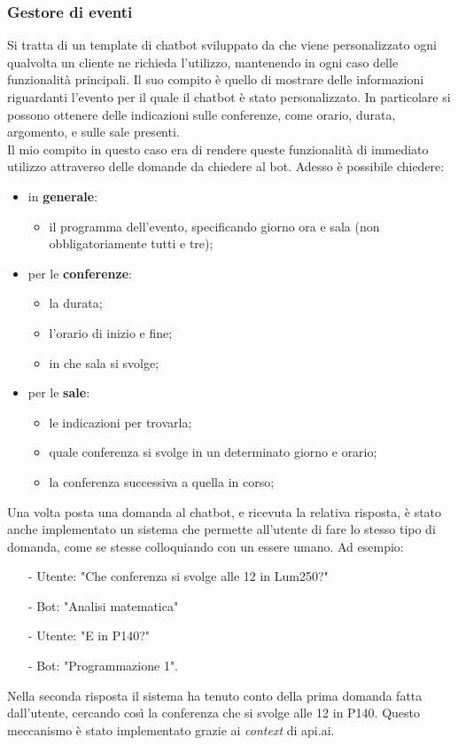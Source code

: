 \subsubsection{Gestore di eventi}
Si tratta di un template di \gls{chatbot} sviluppato da \azienda{} che viene  personalizzato ogni qualvolta un cliente ne richieda l'utilizzo, mantenendo in ogni caso delle funzionalità principali. Il suo compito è quello di mostrare delle informazioni riguardanti l'evento per il quale il \gls{chatbot} è stato personalizzato. In particolare si possono ottenere delle indicazioni sulle conferenze, come orario, durata, argomento, e sulle sale presenti.\\
Il mio compito in questo caso era di rendere queste funzionalità di immediato utilizzo attraverso delle domande da chiedere al bot. Adesso è possibile chiedere:
\begin{itemize}
	\item in \textbf{generale}:
	\begin{itemize}
		\item il programma dell'evento, specificando giorno ora e sala (non obbligatoriamente tutti e tre);
	\end{itemize}
	\item per le \textbf{conferenze}:
	\begin{itemize}
		\item la durata;
		\item l'orario di inizio e fine;
		\item in che sala si svolge;
	\end{itemize}
	\item per le \textbf{sale}:
	\begin{itemize}
		\item le indicazioni per trovarla;
		\item quale conferenza si svolge in un determinato giorno e orario;
		\item la conferenza successiva a quella in corso;
	\end{itemize}
\end{itemize}

Una volta posta una domanda al \gls{chatbot}, e ricevuta la relativa risposta, è stato anche implementato un sistema che permette all'utente di fare lo stesso tipo di domanda, come se stesse colloquiando con un essere umano. Ad esempio:

\begin{itemize}
	\item[-] Utente: "Che conferenza si svolge alle 12 in Lum250?"
	\item[-] Bot: "Analisi matematica"
	\item[-] Utente: "E in P140?"
	\item[-] Bot: "Programmazione 1".
\end{itemize}
Nella seconda risposta il sistema ha tenuto conto della prima domanda fatta dall'utente, cercando così la conferenza che si svolge alle 12 in P140. Questo meccanismo è stato implementato grazie ai \emph{context} di api.ai.

